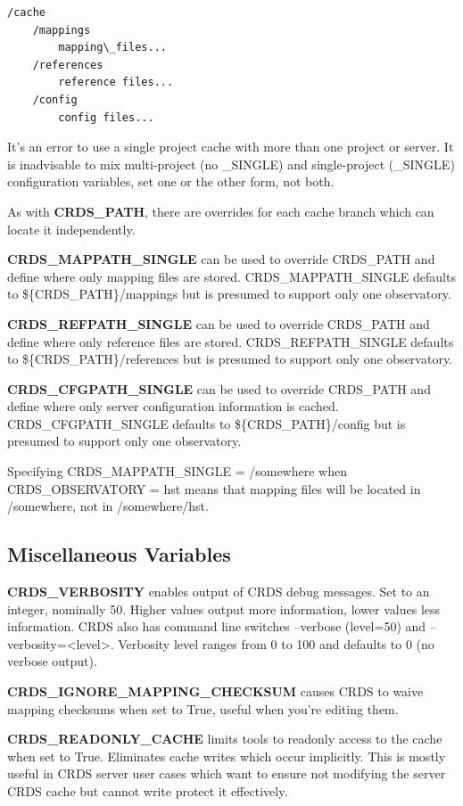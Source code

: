 \documentclass[letterpaper,10pt,english]{sphinxmanual}
\begin{document}
\begin{Verbatim}[commandchars=\\\{\}]
/cache
    /mappings
        mapping\_files...
    /references
        reference files...
    /config
        config files...
\end{Verbatim}

It's an error to use a single project cache with more than one project or server.  It is
inadvisable to mix multi-project (no \_SINGLE) and single-project (\_SINGLE) configuration
variables,  set one or the other form,  not both.

As with \textbf{CRDS\_PATH},  there are overrides for each cache branch which can locate it
independently.

\textbf{CRDS\_MAPPATH\_SINGLE} can be used to override CRDS\_PATH and define where only
mapping files are stored. CRDS\_MAPPATH\_SINGLE defaults to \$\{CRDS\_PATH\}/mappings
but is presumed to support only one observatory.

\textbf{CRDS\_REFPATH\_SINGLE} can be used to override CRDS\_PATH and define where
only reference files are stored.  CRDS\_REFPATH\_SINGLE defaults to \$\{CRDS\_PATH\}/references
but is presumed to support only one observatory.

\textbf{CRDS\_CFGPATH\_SINGLE} can be used to override CRDS\_PATH and define where
only server configuration information is cached.   CRDS\_CFGPATH\_SINGLE defaults to
\$\{CRDS\_PATH\}/config but is presumed to support only one observatory.

Specifying CRDS\_MAPPATH\_SINGLE = /somewhere when CRDS\_OBSERVATORY = hst means that
mapping files will be located in /somewhere,  not in /somewhere/hst.


\subsection{Miscellaneous Variables}
\label{installation:miscellaneous-variables}
\textbf{CRDS\_VERBOSITY} enables output of CRDS debug messages.   Set to an
integer,  nominally 50.   Higher values output more information,  lower
values less information.   CRDS also has command line switches
--verbose (level=50) and --verbosity=\textless{}level\textgreater{}.   Verbosity level
ranges from 0 to 100 and defaults to 0 (no verbose output).

\textbf{CRDS\_IGNORE\_MAPPING\_CHECKSUM} causes CRDS to waive mapping checksums
when set to True,  useful when you're editing them.

\textbf{CRDS\_READONLY\_CACHE} limits tools to readonly access to the cache when set
to True.  Eliminates cache writes which occur implicitly.  This is mostly
useful in CRDS server user cases which want to ensure not modifying the server
CRDS cache but cannot write protect it effectively.
\end{document}

